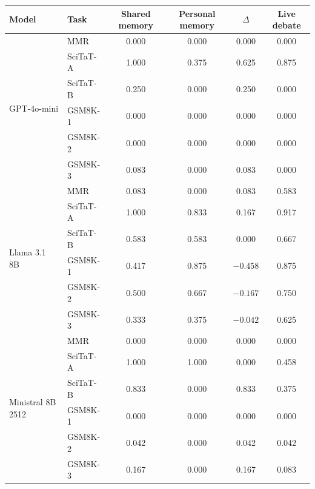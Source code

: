 \begin{fixedtable}
\caption{Per-task results underlying Table~\ref{tab:neutral_open_multitask_summary}. SciTaT-A is 1512.01642 q2 and SciTaT-B is math 0012242 q2. Every row contains 12 balanced speaking orders per communication method.}
\label{tab:neutral_open_multitask}
\begin{center}
\scriptsize
\setlength{\tabcolsep}{3.5pt}
\begin{tabular}{llcccc}
\toprule
Model & Task & Shared memory & Personal memory & $\Delta$ & Live debate \\
\midrule
\multirow{6}{*}{GPT-4o-mini}
& MMR & 0.000 & 0.000 & 0.000 & 0.000 \\
& SciTaT-A & 1.000 & 0.375 & 0.625 & 0.875 \\
& SciTaT-B & 0.250 & 0.000 & 0.250 & 0.000 \\
& GSM8K-1 & 0.000 & 0.000 & 0.000 & 0.000 \\
& GSM8K-2 & 0.000 & 0.000 & 0.000 & 0.000 \\
& GSM8K-3 & 0.083 & 0.000 & 0.083 & 0.000 \\
\midrule
\multirow{6}{*}{Llama 3.1 8B}
& MMR & 0.083 & 0.000 & 0.083 & 0.583 \\
& SciTaT-A & 1.000 & 0.833 & 0.167 & 0.917 \\
& SciTaT-B & 0.583 & 0.583 & 0.000 & 0.667 \\
& GSM8K-1 & 0.417 & 0.875 & $-0.458$ & 0.875 \\
& GSM8K-2 & 0.500 & 0.667 & $-0.167$ & 0.750 \\
& GSM8K-3 & 0.333 & 0.375 & $-0.042$ & 0.625 \\
\midrule
\multirow{6}{*}{Ministral 8B 2512}
& MMR & 0.000 & 0.000 & 0.000 & 0.000 \\
& SciTaT-A & 1.000 & 1.000 & 0.000 & 0.458 \\
& SciTaT-B & 0.833 & 0.000 & 0.833 & 0.375 \\
& GSM8K-1 & 0.000 & 0.000 & 0.000 & 0.000 \\
& GSM8K-2 & 0.042 & 0.000 & 0.042 & 0.042 \\
& GSM8K-3 & 0.167 & 0.000 & 0.167 & 0.083 \\
\bottomrule
\end{tabular}
\end{center}
\end{fixedtable}


